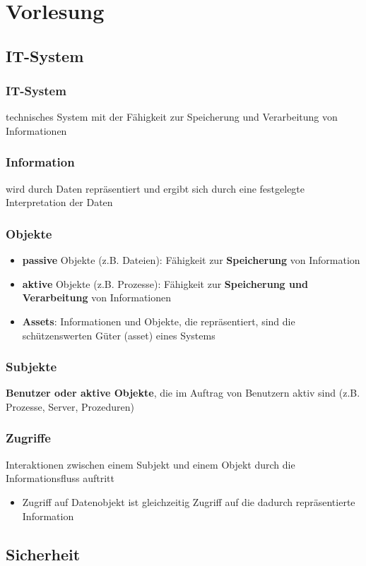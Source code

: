 \documentclass{article}
\begin{document}
\section{Vorlesung}
\subsection{IT-System}
\subsubsection{IT-System}
technisches System mit der Fähigkeit zur Speicherung und Verarbeitung von Informationen
\subsubsection{Information}
wird durch Daten repräsentiert und ergibt sich durch eine festgelegte Interpretation der Daten
\subsubsection{Objekte}
\begin{itemize}
    \item \textbf{passive} Objekte (z.B. Dateien): Fähigkeit zur \textbf{Speicherung} von Information
    \item \textbf{aktive} Objekte (z.B. Prozesse): Fähigkeit zur \textbf{Speicherung und Verarbeitung} von Informationen
    \item \textbf{Assets}: Informationen und Objekte, die repräsentiert, sind die schützenswerten Güter (asset) eines Systems 
\end{itemize}
\subsubsection{Subjekte}
\textbf{Benutzer oder aktive Objekte}, die im Auftrag von Benutzern aktiv sind (z.B. Prozesse, Server, Prozeduren)
\subsubsection{Zugriffe}
Interaktionen zwischen einem Subjekt und einem Objekt durch die Informationsfluss auftritt
\begin{itemize}
    \item Zugriff auf Datenobjekt ist gleichzeitig Zugriff auf die dadurch repräsentierte Information
\end{itemize}
\subsection{Sicherheit}
\end{document}
